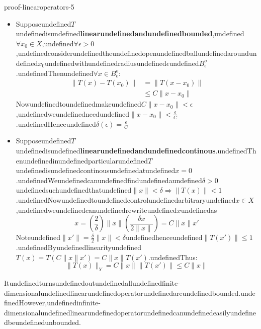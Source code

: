 \begin{mystthmproof}{}{proof-linearoperators-5}\begin{itemize}
\item Supposeundefined$T$undefinedisundefined\textbf{linearundefinedandundefinedbounded},undefined$\forall x_0 \in X$,undefined$\forall \epsilon > 0$,undefinedconsiderundefinedtheundefinedopenundefinedballundefinedaroundundefined$x_0$undefinedwithundefinedradiusundefined$\epsilon$undefined$B_{\epsilon}^o$.undefinedThenundefined$\forall x\in B_{\epsilon}^o$:
\begin{equation}
\begin{aligned}
\|T(x)-T(x_0)\| &= \|T(x-x_0)\| \\
&\leq C\|x-x_0\|
\end{aligned}
\end{equation}
Nowundefinedtoundefinedmakeundefined$C\|x -x_0\|<\epsilon$,undefinedweundefinedneedundefined$\|x -x_0\|<\frac{\epsilon}{C}$.undefinedHenceundefined$\delta(\epsilon)=\frac{\epsilon}{C}$


\item Supposeundefined$T$undefinedisundefined\textbf{linearundefinedandundefinedcontinous}.undefinedThenundefinedinundefinedparticularundefined$T$undefinedisundefinedcontinousundefinedatundefined$x=0$.undefinedWeundefinedcanundefinedfindundefinedaundefined$\delta >0$undefinedsuchundefinedthatundefined$\|x\| < \delta \Rightarrow \|T(x)\| < 1$.undefinedNowundefinedtoundefinedcontrolundefinedarbitraryundefined$x\in X$,undefinedweundefinedcanundefinedrewriteundefined$x$undefinedas
\begin{equation}
x=\left(\frac{2}{\delta }\right)\|x\|\left(\frac{\delta x}{2\|x\|}\right)=C\|x\|x'
\end{equation}
Noteundefined$\|x'\|=\frac{\delta }{2}\|x\|<\delta$undefinedhenceundefined$\|T(x')\|\leq 1$.undefinedByundefinedlinearityundefined$T(x)=T(C\|x\|x')=C\|x\|T(x')$.undefinedThus:
\begin{equation}
\|T(x)\|_Y=C\|x\|\|T(x')\|\leq C\|x\|
\end{equation}
\end{itemize}

\end{mystthmproof}
Itundefinedturnsundefinedoutundefinedallundefinedfinite-dimensionalundefinedlinearundefinedoperatorundefinedareundefinedbounded.undefinedHowever,undefinedinfinite-dimensionalundefinedlinearundefinedoperatorundefinedcanundefinedeasilyundefinedbeundefinedunbounded.

